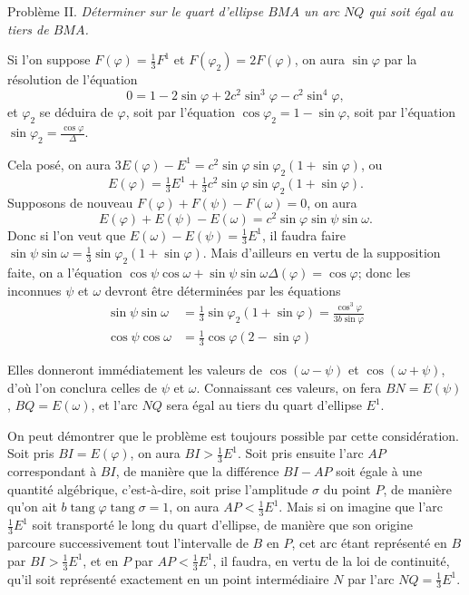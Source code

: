 \documentclass{article}
\begin{document}
Problème II. \emph{Déterminer sur le quart d'ellipse $BMA$ un arc $NQ$ qui soit égal au tiers de $BMA$.}

Si l'on suppose $F(\varphi)=\frac{1}{3}F^{1}$ et $F(\varphi_{2})=2F(\varphi)$, on aura $\sin\varphi$ par la résolution de l'équation
\[ 0=1-2\sin\varphi+2c^{2}\sin^{3}\varphi-c^{2}\sin^{4}\varphi, \]
et $\varphi_{2}$ se déduira de $\varphi$, soit par l'équation $\cos\varphi_{2}=1-\sin\varphi$, soit par l'équation $\sin\varphi_{2}=\frac{\cos\varphi}{\Delta}$.

Cela posé, on aura $3E(\varphi)-E^{1}=c^{2}\sin\varphi\sin\varphi_{2}(1+\sin\varphi)$, ou
\[ E(\varphi)=\tfrac{1}{3}E^{1}+\tfrac{1}{3}c^{2}\sin\varphi\sin\varphi_{2}(1+\sin\varphi). \]
Supposons de nouveau $F(\varphi)+F(\psi)-F(\omega)=0$, on aura
\[ E(\varphi)+E(\psi)-E(\omega)=c^{2}\sin\varphi\sin\psi\sin\omega. \]
Donc si l'on veut que $E(\omega)-E(\psi)=\frac{1}{3}E^{1}$, il faudra faire $\sin\psi\sin\omega=\frac{1}{3}\sin\varphi_{2}(1+\sin\varphi)$. Mais d'ailleurs en vertu de la supposition faite, on a l'équation $\cos\psi\cos\omega+\sin\psi\sin\omega\Delta(\varphi)=\cos\varphi$; donc les inconnues $\psi$ et $\omega$ devront être déterminées par les équations
\[ \begin{aligned} \sin\psi\sin\omega&=\tfrac{1}{3}\sin\varphi_{2}(1+\sin\varphi)=\frac{\cos^{3}\varphi}{3b\sin\varphi}\\ \cos\psi\cos\omega&=\tfrac{1}{3}\cos\varphi(2-\sin\varphi) \end{aligned} \]

Elles donneront immédiatement les valeurs de $\cos(\omega-\psi)$ et $\cos(\omega+\psi)$, d'où l'on conclura celles de $\psi$ et $\omega$. Connaissant ces valeurs, on fera $BN=E(\psi)$, $BQ=E(\omega)$, et l'arc $NQ$ sera égal au tiers du quart d'ellipse $E^{1}$.

On peut démontrer que le problème est toujours possible par cette considération. Soit pris $BI=E(\varphi)$, on aura $BI>\frac{1}{3}E^{1}$. Soit pris ensuite l'arc $AP$ correspondant à $BI$, de manière que la différence $BI-AP$ soit égale à une quantité algébrique, c'est-à-dire, soit prise l'amplitude $\sigma$ du point $P$, de manière qu'on ait $b\operatorname{tang}\varphi\operatorname{tang}\sigma=1$, on aura $AP<\frac{1}{3}E^{1}$. Mais si on imagine que l'arc $\frac{1}{3}E^{1}$ soit transporté le long du quart d'ellipse, de manière que son origine parcoure successivement tout l'intervalle de $B$ en $P$, cet arc étant représenté en $B$ par $BI>\frac{1}{3}E^{1}$, et en $P$ par $AP<\frac{1}{3}E^{1}$, il faudra, en vertu de la loi de continuité, qu'il soit représenté exactement en un point intermédiaire $N$ par l'arc $NQ=\frac{1}{3}E^{1}$.
\end{document}
